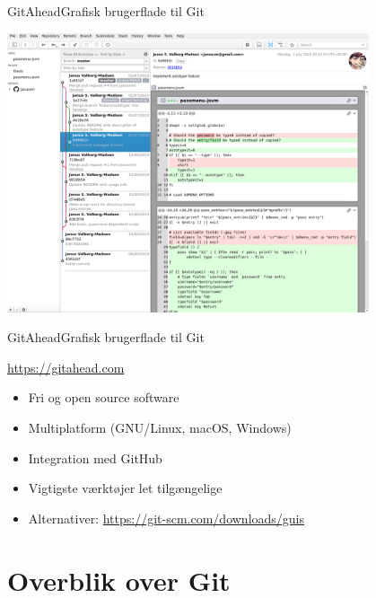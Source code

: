 \documentclass[10pt]{beamer}
\begin{document}
\begin{frame}{GitAhead}{Grafisk brugerflade til Git}
  \begin{center}
    \includegraphics[width=0.8\textwidth]{img/gitahead}
  \end{center}
\end{frame}

\begin{frame}{GitAhead}{Grafisk brugerflade til Git}
  \begin{block}{\url{https://gitahead.com}}
    \begin{itemize}
    \item Fri og open source software
    \item Multiplatform (GNU/Linux, macOS, Windows)
    \item Integration med GitHub
    \item Vigtigste værktøjer let tilgængelige
    \item Alternativer: \url{https://git-scm.com/downloads/guis}
    \end{itemize}
  \end{block}
\end{frame}

\section{Overblik over Git}
\label{sec:gitcmds}
\end{document}
